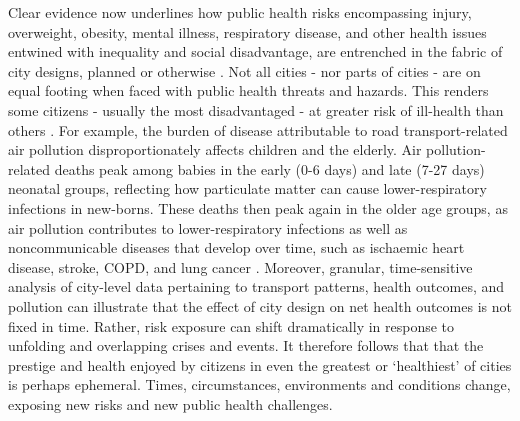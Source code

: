 \documentclass[preprint,12pt]{elsarticle}
\begin{document}
Clear evidence now underlines how public health risks encompassing injury, overweight, obesity, mental illness, respiratory disease, and other health issues entwined with inequality and social disadvantage, are entrenched in the fabric of city designs, planned or otherwise \cite{borrell2013factors,xing2016impact}. Not all cities - nor parts of cities - are on equal footing when faced with public health threats and hazards. This renders some citizens - usually the most disadvantaged - at greater risk of ill-health than others \cite{KRISHNA2021102046}. For example, the burden of disease attributable to road transport-related air pollution disproportionately affects children and the elderly. Air pollution-related deaths peak among babies in the early (0-6 days) and late (7-27 days) neonatal groups, reflecting how particulate matter can cause lower-respiratory infections in new-borns. These deaths then peak again in the older age groups, as air pollution contributes to lower-respiratory infections as well as noncommunicable diseases that develop over time, such as ischaemic heart disease, stroke, COPD, and lung cancer \cite{boogaard2022long}. Moreover, granular, time-sensitive analysis of city-level data pertaining to transport patterns, health outcomes, and pollution can illustrate that the effect of city design on net health outcomes is not fixed in time. Rather, risk exposure can shift dramatically in response to unfolding and overlapping crises and events. It therefore follows that that the prestige and health enjoyed by citizens in even the greatest or `healthiest' of cities is perhaps ephemeral. Times, circumstances, environments and conditions change, exposing new risks and new public health challenges.
\end{document}
